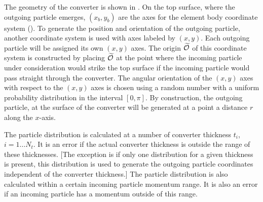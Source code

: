 
The geometry of the converter is shown in . On the top surface, where the outgoing
particle emerges, $(x_b,y_b)$ are the axes for the element body coordinate system ().
To generate the position and orientation of the outgoing particle, another coordinate system is used
with axes labeled by $(x,y)$. Each outgoing particle will be assigned its own $(x,y)$
axes. The origin $\widetilde{{\cal O}}$ of this coordinate system is constructed by placing $\widetilde{{\cal O}}$ at the
point where the incoming particle under consideration would strike the top surface if the incoming
particle would pass straight through the converter. The angular orientation of the $(x,y)$ axes
with respect to the $(x,y)$ axes is chosen using a random number with a uniform probability
distribution in the interval $[0, \pi]$. By construction, the outgoing particle, at the surface of
the converter will be generated at a point a distance $r$ along the $x$-axis.

The particle distribution is calculated at a number of converter thickness $t_i$, $i = 1 \ldots
N_t$. It is an error if the actual converter thickness is outside the range of these
thicknesses. [The exception is if only one distribution for a given thickness is present, this
distribution is used to generate the outgoing particle coordinates independent of the converter
thickness.]  The particle distribution is also calculated within a certain incoming particle
momentum range. It is also an error if an incoming particle has a momentum outside of this range.


